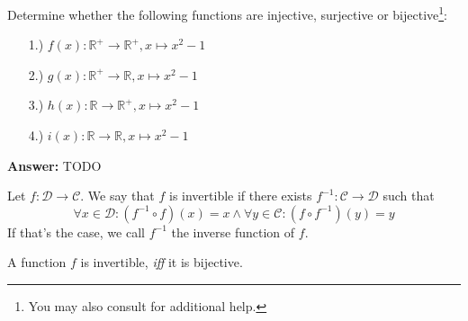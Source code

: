 \begin{exm}\label{exm-injective-surjective-bijective}
    Determine whether the following functions are injective, surjective or
    bijective\footnote{You may also consult  for
    additional help.}:
    \begin{enumerate}
        \item[1.)] $f(x):\mathbb{R}^+\rightarrow\mathbb{R}^+,x\mapsto x^2-1$
        \item[2.)] $g(x):\mathbb{R}^+\rightarrow\mathbb{R},x\mapsto x^2-1$
        \item[3.)] $h(x):\mathbb{R}\rightarrow\mathbb{R}^+,x\mapsto x^2-1$
        \item[4.)] $i(x):\mathbb{R}\rightarrow\mathbb{R},x\mapsto x^2-1$ 
    \end{enumerate}
    \begin{flushleft}
        \textbf{Answer:} TODO
    \end{flushleft}
\end{exm}

\begin{definition}\label{def-inverse-function}
    Let $f:\mathcal{D}\to\mathcal{C}$. We say that $f$ is invertible if there exists
    $f^{-1}:\mathcal{C}\to\mathcal{D}$ such that
    \begin{equation}
        \forall x\in\mathcal{D}:(f^{-1}\circ f)(x)=x 
        \land \forall y\in\mathcal{C}:(f \circ f^{-1})(y)=y
    \end{equation}
    If that's the case, we call $f^{-1}$ the inverse function of $f$.
\end{definition}

\begin{thm}\label{thm-inverse-function}
    A function $f$ is invertible, \textit{iff} it is bijective.
\end{thm}

